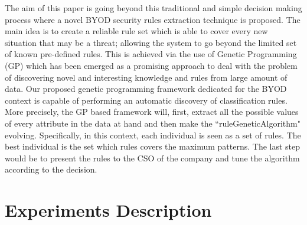 \documentclass[runningheads,a4paper]{llncs}
\begin{document}
The aim of this paper is going beyond this traditional and simple decision making process where a novel  BYOD security rules extraction technique is proposed. The main idea is to create a reliable rule set which is able to cover every new situation that may be a threat; allowing the system to go beyond the limited set of known pre-defined rules. This is achieved via the use of Genetic Programming (GP) which has been emerged as a promising approach to deal with the problem of discovering novel and interesting knowledge and rules from large amount of data. Our proposed genetic programming framework dedicated for the BYOD context is capable of performing an automatic discovery of classification rules. More precisely, the GP based framework will, first, extract all the possible values of every attribute in the data at hand and then make the ``ruleGeneticAlgorithm" evolving. Specifically, in this context, each individual is seen as a set of rules. The best individual is the set which rules covers the maximum patterns. The last step would be to present the rules to the CSO of the company and tune the algorithm according to the decision.




\section{Experiments Description}
\label{sec:experiments}



\end{document}
